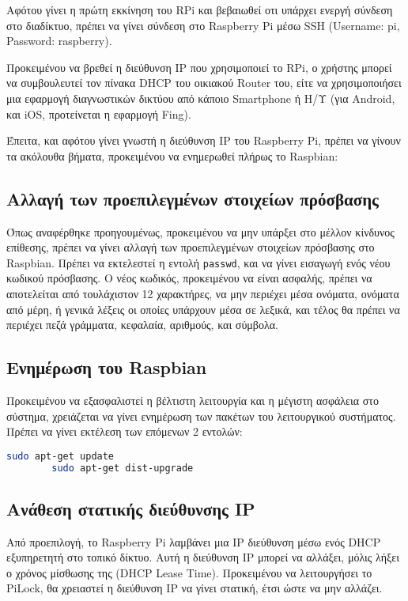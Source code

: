 	Αφότου γίνει η πρώτη εκκίνηση του RPi και βεβαιωθεί οτι υπάρχει ενεργή σύνδεση στο διαδίκτυο, πρέπει να γίνει σύνδεση στο Raspberry Pi μέσω SSH (Username: pi, Password: raspberry).

	Προκειμένου να βρεθεί η διεύθυνση IP που χρησιμοποιεί το RPi, ο χρήστης μπορεί να συμβουλευτεί τον πίνακα DHCP του οικιακού Router του, είτε να χρησιμοποιήσει μια εφαρμογή διαγνωστικών δικτύου από κάποιο Smartphone ή Η/Υ (για Android, και iOS, προτείνεται η εφαρμογή Fing).

	Έπειτα, και αφότου γίνει γνωστή η διεύθυνση IP του Raspberry Pi, πρέπει να γίνουν τα ακόλουθα βήματα, προκειμένου να ενημερωθεί πλήρως το Raspbian:

	\subsection{Αλλαγή των προεπιλεγμένων στοιχείων πρόσβασης}
		Όπως αναφέρθηκε προηγουμένως, προκειμένου να μην υπάρξει στο μέλλον κίνδυνος επίθεσης, πρέπει να γίνει αλλαγή των προεπιλεγμένων στοιχείων πρόσβασης στο Raspbian. Πρέπει να εκτελεστεί η εντολή \verb|passwd|, και να γίνει εισαγωγή ενός νέου κωδικού πρόσβασης. Ο νέος κωδικός, προκειμένου να είναι ασφαλής, πρέπει να αποτελείται από τουλάχιστον 12 χαρακτήρες, να μην περιέχει μέσα ονόματα, ονόματα από μέρη, ή γενικά λέξεις οι οποίες υπάρχουν μέσα σε λεξικά, και τέλος θα πρέπει να περιέχει πεζά γράμματα, κεφαλαία, αριθμούς, και σύμβολα.

	\subsection{Ενημέρωση του Raspbian}
		Προκειμένου να εξασφαλιστεί η βέλτιστη λειτουργία και η μέγιστη ασφάλεια στο σύστημα, χρειάζεται να γίνει ενημέρωση των πακέτων του λειτουργικού συστήματος. Πρέπει να γίνει εκτέλεση των επόμενων 2 εντολών:

		\begin{lstlisting}[language=bash]
		sudo apt-get update
		sudo apt-get dist-upgrade\end{lstlisting}

	\subsection{Ανάθεση στατικής διεύθυνσης IP}
		Από προεπιλογή, το Raspberry Pi λαμβάνει μια IP διεύθυνση μέσω ενός DHCP εξυπηρετητή στο τοπικό δίκτυο. Αυτή η διεύθυνση IP μπορεί να αλλάξει, μόλις λήξει ο χρόνος μίσθωσης της (DHCP Lease Time). Προκειμένου να λειτουργήσει το PiLock, θα χρειαστεί η διεύθυνση IP να γίνει στατική, έτσι ώστε να μην αλλάζει.

